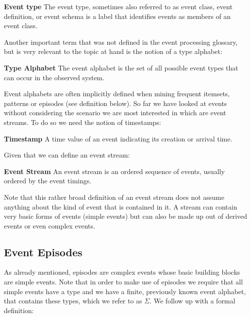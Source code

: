 \begin{mydef}
\textbf{Event type} The event type, sometimes also referred to as event class, event definition, or event schema is a label that identifies events as members of an event class.
\end{mydef}

Another important term that was not defined in the event processing glossary, but is very relevant to the topic at hand is the notion of a type alphabet:

\begin{mydef}
\textbf{Type Alphabet} The event alphabet is the set of all possible event types that can occur in the observed system.
\end{mydef}

Event alphabets are often implicitly defined when mining frequent itemsets, patterns or episodes (see definition below).
So far we have looked at events without considering the scenario we are most interested in which are event streams. To do so we need the notion of timestamps:

\begin{mydef}
\textbf{Timestamp} A time value of an event indicating its creation or arrival time.
\end{mydef}

Given that we can define an event stream:

\begin{mydef}
\textbf{Event Stream} An event stream is an ordered sequence of events, usually ordered by the event timings.
\end{mydef}

Note that this rather broad definition of an event stream does not assume anything about the kind of event that is contained in it. A stream can contain very basic forms of events (simple events) but can also be made up out of derived events or even complex events. 


\subsection{Event Episodes}

As already mentioned, episodes are complex events whose basic building blocks are simple events. Note that  in order to make use of episodes we require that all simple events have a type and we have a finite, previously known event alphabet, that contains these types, which we refer to as $\Sigma$. We follow up with a formal definition:

